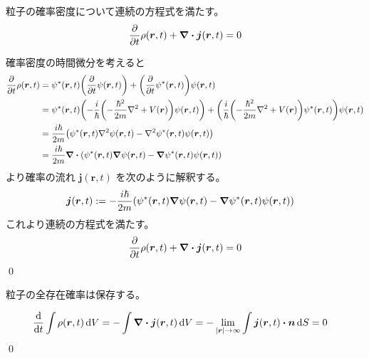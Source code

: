 \documentclass[uplatex,dvipdfmx,a4paper,11pt]{jlreq}
\makeatletter
\newcommand{\rr}{\bm{r}}
\numberwithin{equation}{section}
\theoremstyle{definition}
\renewenvironment{proof}[1][\proofname]{\par
  \normalfont
  \topsep6\p@\@plus6\p@ \trivlist
  \item[\hskip\labelsep{\bfseries #1}\@addpunct{\bfseries}]\ignorespaces\quad\par
}{%
  \qed\endtrivlist\@endpefalse
}
\renewcommand\proofname{証明}
\makeatother
\begin{document}
\begin{theorem}
  粒子の確率密度について連続の方程式を満たす。
  \begin{align}
    \pdv{t}\rho(\rr, t) + \vnabla\vdot\bm{j}(\rr, t) = 0
  \end{align}
\end{theorem}
\begin{proof}
  確率密度の時間微分を考えると
  \begin{align}
    \pdv{t}\rho(\rr, t) & = \psi^*(\rr, t)\qty(\pdv{t}\psi(\rr, t)) + \qty(\pdv{t}\psi^*(\rr, t))\psi(\rr, t)                                                                                                      \\
                        & = \psi^*(\rr, t)\qty(-\frac{i}{\hbar}\qty(-\frac{\hbar^2}{2m}\nabla^2 + V(\rr))\psi(\rr, t)) + \qty(\frac{i}{\hbar}\qty(-\frac{\hbar^2}{2m}\nabla^2 + V(\rr))\psi^*(\rr, t))\psi(\rr, t) \\
                        & = \frac{i\hbar}{2m}\qty(\psi^*(\rr, t)\nabla^2\psi(\rr, t) - \nabla^2\psi^*(\rr, t)\psi(\rr, t))                                                                                         \\
                        & = \frac{i\hbar}{2m}\vnabla\vdot\qty(\psi^*(\rr, t)\vnabla\psi(\rr, t) - \vnabla\psi^*(\rr, t)\psi(\rr, t))
  \end{align}
  より確率の流れ $\bm{j}(\rr, t)$ を次のように解釈する。
  \begin{align}
    \bm{j}(\rr, t) & := -\frac{i\hbar}{2m}\qty(\psi^*(\rr, t)\vnabla\psi(\rr, t) - \vnabla\psi^*(\rr, t)\psi(\rr, t))
  \end{align}
  これより連続の方程式を満たす。
  \begin{align}
    \pdv{t}\rho(\rr, t) + \vnabla\vdot\bm{j}(\rr, t) = 0
  \end{align}
\end{proof}

\begin{theorem}
  粒子の全存在確率は保存する。
\end{theorem}
\begin{proof}
  \begin{align}
    \dv{t}\int\rho(\rr, t)\dd{V} & = -\int\vnabla\vdot\bm{j}(\rr, t)\dd{V} = -\lim_{|\rr|\to\infty}\int\bm{j}(\rr, t)\vdot\bm{n}\dd{S} = 0
  \end{align}
\end{proof}
\end{document}
